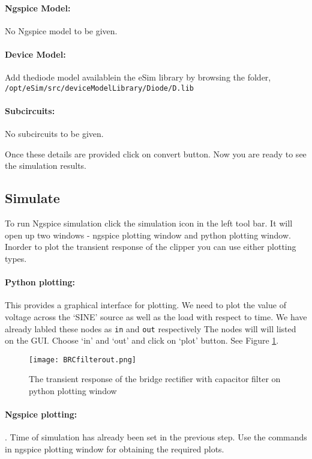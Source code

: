\paragraph{Ngspice Model:} No Ngspice model to be given.

\paragraph{Device Model:} Add thediode model availablein the eSim library by browsing the folder, \texttt{/opt/eSim/src/deviceModelLibrary/Diode/D.lib}

\paragraph{Subcircuits:} No subcircuits to be given.

\noindent Once these details are provided click on convert button.  Now you are ready to see the simulation results.


\paragraph{}
\subsection*{Simulate} To run Ngspice simulation click the simulation icon in the left tool bar. It will open up two windows - ngspice plotting window and python plotting window. Inorder to plot the transient response of the clipper you can use either plotting types.

\paragraph{Python plotting:}This provides a graphical interface for plotting. We need to plot the value of voltage across the `SINE' source as well as the load with respect to time. We have already labled these nodes as \texttt{in} and \texttt{out} respectively The nodes will will listed on the GUI. Choose  `in' and `out' and click on `plot' button. See Figure \ref{BRCfilterout}.

\begin{figure}[h]
\centering
\texttt{[image: BRCfilterout.png]}
\caption{The transient response of the bridge rectifier with capacitor filter on python plotting window}
\label{BRCfilterout}
\end{figure}

\paragraph{Ngspice plotting:}. Time of simulation has already been set in the previous step. Use the commands in ngspice plotting window for obtaining the required plots.

